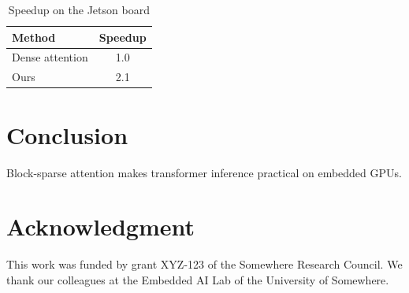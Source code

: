 \documentclass[conference]{IEEEtran}
\begin{document}
\begin{table}[t]
  \caption{Speedup on the Jetson board}
  \label{tab:speed}
  \centering
  \begin{tabular}{lc}
    \toprule
    Method & Speedup \\
    \midrule
    Dense attention & 1.0 \\
    Ours & 2.1 \\
    \bottomrule
  \end{tabular}
\end{table}
\vspace{-2mm}

\section{Conclusion}
Block-sparse attention makes transformer inference practical on embedded GPUs.

\section*{Acknowledgment}
This work was funded by grant XYZ-123 of the Somewhere Research Council. We
thank our colleagues at the Embedded AI Lab of the University of Somewhere.



\end{document}

